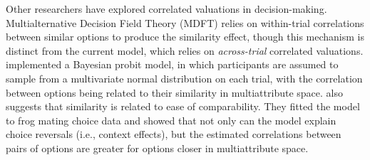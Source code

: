 Other researchers have explored correlated valuations in decision-making. Multialternative Decision Field Theory (MDFT) \parencite{roeMultialternativeDecisionField2001a} relies on within-trial correlations between similar options to produce the similarity effect, though this mechanism is distinct from the current model, which relies on \textit{across-trial} correlated valuations. \textcite{natenzon2019random} implemented a Bayesian probit model, in which participants are assumed to sample from a multivariate normal distribution on each trial, with the correlation between options being related to their similarity in multiattribute space. \textcite{natenzon2019random} also suggests that similarity is related to ease of comparability. They fitted the model to frog mating choice data and showed that not only can the model explain choice reversals (i.e., context effects), but the estimated correlations between pairs of options are greater for options closer in multiattribute space. 



